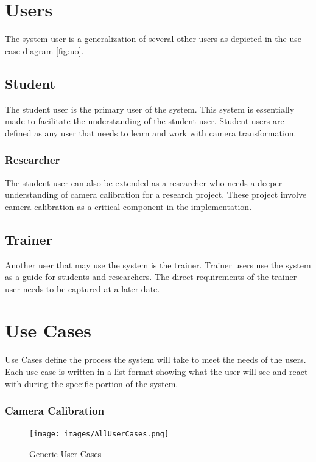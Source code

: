 \documentclass[11pt]{report}
\begin{document}
\section{Users} 

The system user is a generalization of several other users as depicted in the use case diagram \ref{fig:uo}.  

\subsection{Student}

The student user is the primary user of the system. This system is essentially made to facilitate the understanding of the student user. Student users are defined as any user that needs to learn and work with camera transformation.  

\subsubsection{Researcher}

The student user can also be extended as a researcher who needs a deeper understanding of camera calibration for a research project. These project involve camera calibration as a critical component in the implementation. 

\subsection{Trainer}

Another user that may use the system is the trainer. Trainer users use the system as a guide for students and researchers. The direct requirements of the trainer user needs to be captured at a later date.

\section{Use Cases}

Use Cases define the process the system will take to meet the needs of the users. Each use case is written in a list format showing what the user will see and react with during the specific portion of the system. 
\subsubsection{Camera Calibration}

\begin{figure}[htp]
\centering
\texttt{[image: images/AllUserCases.png]}
\caption{Generic User Cases}
\label{fig:guc}
\end{figure}
\end{document}
